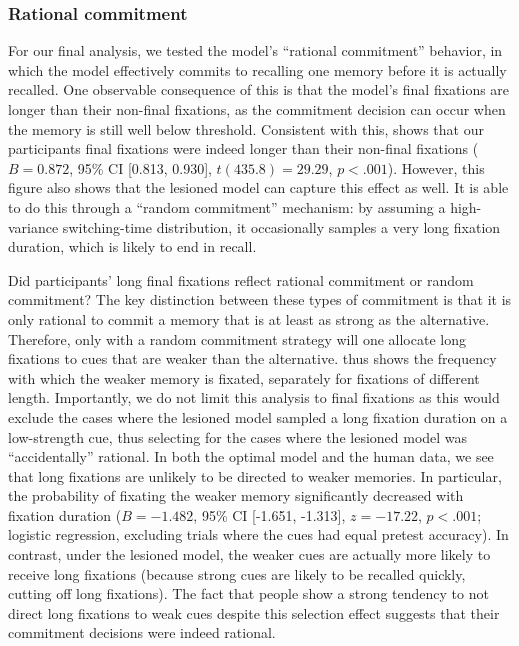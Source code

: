 \subsubsection{Rational commitment}

For our final analysis, we tested the model's ``rational commitment'' behavior, in which the model effectively commits to recalling one memory before it is actually recalled. One observable consequence of this is that the model's final fixations are longer than their non-final fixations, as the commitment decision can occur when the memory is still well below threshold. Consistent with this,  shows that our participants final fixations were indeed longer than their non-final fixations ($B = 0.872$, 95\% CI [0.813, 0.930], $t(435.8)=29.29$, $p < .001$). However, this figure also shows that the lesioned model can capture this effect as well. It is able to do this through a ``random commitment'' mechanism: by assuming a high-variance switching-time distribution, it occasionally samples a very long fixation duration, which is likely to end in recall. 

Did participants' long final fixations reflect rational commitment or random commitment? The key distinction between these types of commitment is that it is only rational to commit a memory that is at least as strong as the alternative. Therefore, only with a random commitment strategy will one allocate long fixations to cues that are weaker than the alternative.  thus shows the frequency with which the weaker memory is fixated, separately for fixations of different length. Importantly, we do not limit this analysis to final fixations as this would exclude the cases where the lesioned model sampled a long fixation duration on a low-strength cue, thus selecting for the cases where the lesioned model was ``accidentally'' rational. In both the optimal model and the human data, we see that long fixations are unlikely to be directed to weaker memories. In particular, the probability of fixating the weaker memory significantly decreased with fixation duration ($B = -1.482$, 95\% CI [-1.651, -1.313], $z=-17.22$, $p < .001$; logistic regression, excluding trials where the cues had equal pretest accuracy). In contrast, under the lesioned model, the weaker cues are actually more likely to receive long fixations (because strong cues are likely to be recalled quickly, cutting off long fixations). The fact that people show a strong tendency to not direct long fixations to weak cues despite this selection effect suggests that their commitment decisions were indeed rational.

